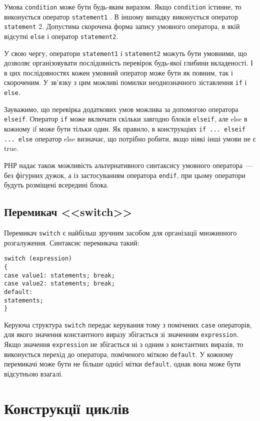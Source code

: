 Умова \verb'condition' може бути будь-яким виразом. Якщо \verb'condition' істинне, то виконується оператор \verb'statement1' . В іншому випадку виконується оператор \verb'statement' 2. Допустима скорочена форма запису умовного оператора, в якій відсутні \verb'else' і оператор \verb'statement2'.

У свою чергу, оператори \verb'statement1' і \verb'statement2' можуть бути умовними, що дозволяє організовувати послідовність перевірок будь-якої глибини вкладеності. І в цих послідовностях кожен умовний оператор може бути як повним, так і скороченим. У зв'язку з цим можливі помилки неоднозначного зіставлення \verb'if' і \verb'else'.

Зауважимо, що перевірка додаткових умов можлива за допомогою оператора \verb|elseif|. Оператор \verb|if| може включати скільки завгодно блоків \verb'elseif', але else в кожному if може бути тільки один. Як правило, в конструкціях \verb'if ... elseif ... else' оператор else визначає, що потрібно робити, якщо ніякі інші умови не є true. 

РНР надає також можливість альтернативного синтаксису умовного оператора~--- без фігурних дужок, а із застосуванням оператора \verb'endif', при цьому оператори будуть розміщені всередині блока.

\subsection*{Перемикач <<switch>>}

Перемикач \verb'switch' є найбільш зручним засобом для організації множинного розгалуження. Синтаксис перемикача такий:
\begin{verbatim}
switch (expression) 
{
case value1: statements; break;
case value2: statements; break;
default:
statements;
}
\end{verbatim}

Керуюча структура \verb'switch' передає керування тому з помічених \verb'case' операторів, для якого значення константного виразу збігається зі значенням \verb'expression'. Якщо значення \verb'expression' не збігається ні з одним з константних виразів, то виконується перехід до оператора, поміченого міткою \verb'default'. У кожному перемикачі може бути не більше однієї мітки \verb'default', однак вона може бути відсутньою взагалі.


\pagebreak[3]

\section{Конструкції циклів}
\nopagebreak[4]

